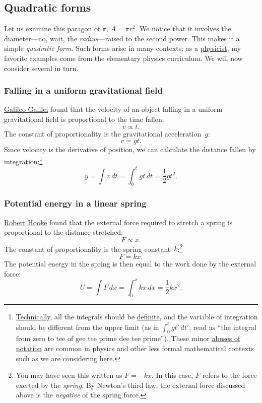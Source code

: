   \subsection{Quadratic forms} %
  \label{sec:quadratic_forms}

Let us examine this paragon of $\pi$, $A = \pi r^2$. We notice that it involves the diameter---no, wait, the \emph{radius}---raised to the second power. This makes it a simple \emph{quadratic form}. Such forms arise in many contexts; as a \href{https://thesis.library.caltech.edu/1940/}{physicist}, my favorite examples come from the elementary physics curriculum. We will now consider several in turn.

    \subsubsection{Falling in a uniform gravitational field} %
    \label{sec:falling_in_a_uniform_gravitational_field}

\href{https://en.wikipedia.org/wiki/Galileo_Galilei}{Galileo Galilei} found that the velocity of an object falling in a uniform gravitational field is proportional to the time fallen:
\[ v \propto t. \]
The constant of proportionality is the gravitational acceleration~$g$:
\[ v = g t. \]
Since velocity is the derivative of position, we can calculate the distance fallen by integration:\footnote{\href{https://xkcd.com/1475/}{Technically}, all the integrals should be \href{https://mathworld.wolfram.com/DefiniteIntegral.html}{definite}, and the variable of integration should be different from the upper limit (as in $\int_0^t gt'\,dt'$, read as ``the integral from zero to tee of gee tee prime dee tee prime''). These minor \href{https://en.wikipedia.org/wiki/Abuse_of_notation}{abuses of notation} are common in physics and other less formal mathematical contexts such as we are considering here.}
\[ y = \int v\,dt = \int_0^t gt\,dt = \textstyle{\frac{1}{2}} gt^2. \]


    \subsubsection{Potential energy in a linear spring} %
    \label{sec:potential_energy_in_a_linear_spring}

\href{https://en.wikipedia.org/wiki/Robert_Hooke}{Robert Hooke} found that the external force required to stretch a spring is proportional to the distance stretched:
\[ F \propto x. \]
The constant of proportionality is the spring constant~$k$:\footnote{You may have seen this written as $F = -kx$. In this case, $F$ refers to the force exerted by the \emph{spring}. By Newton's third law, the external force discussed above is the \emph{negative} of the spring force.}
\[ F = k x. \]
The potential energy in the spring is then equal to the work done by the external force:
\[ U = \int F\,dx = \int_0^x kx\,dx = \textstyle{\frac{1}{2}} kx^2. \]

